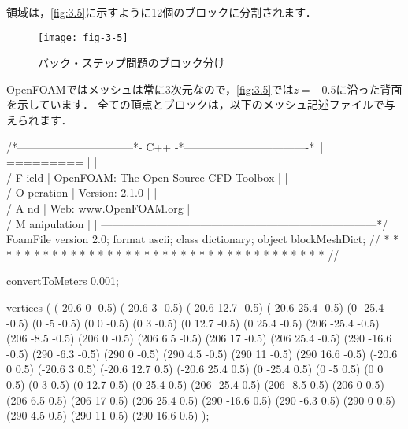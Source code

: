 領域は，\autoref{fig:3.5}に示すように12個のブロックに分割されます．


\begin{figure}[ht]
 \texttt{[image: fig-3-5]}
 \caption{バック・ステップ問題のブロック分け}
 \label{fig:3.5}
\end{figure}


OpenFOAMではメッシュは常に3次元なので，\autoref{fig:3.5}では$z = -0.5$に沿った背面を示しています．
全ての頂点とブロックは，以下のメッシュ記述ファイルで与えられます．
\begin{OFverbatim}
/*--------------------------------*- C++ -*----------------------------------*\
| =========                 |                                                 |
| \\      /  F ield         | OpenFOAM: The Open Source CFD Toolbox           |
|  \\    /   O peration     | Version:  2.1.0                                 |
|   \\  /    A nd           | Web:      www.OpenFOAM.org                      |
|    \\/     M anipulation  |                                                 |
\*---------------------------------------------------------------------------*/
FoamFile
{
    version     2.0;
    format      ascii;
    class       dictionary;
    object      blockMeshDict;
}
// * * * * * * * * * * * * * * * * * * * * * * * * * * * * * * * * * * * * * //

convertToMeters 0.001;

vertices
(
    (-20.6 0 -0.5)
    (-20.6 3 -0.5)
    (-20.6 12.7 -0.5)
    (-20.6 25.4 -0.5)
    (0 -25.4 -0.5)
    (0 -5 -0.5)
    (0 0 -0.5)
    (0 3 -0.5)
    (0 12.7 -0.5)
    (0 25.4 -0.5)
    (206 -25.4 -0.5)
    (206 -8.5 -0.5)
    (206 0 -0.5)
    (206 6.5 -0.5)
    (206 17 -0.5)
    (206 25.4 -0.5)
    (290 -16.6 -0.5)
    (290 -6.3 -0.5)
    (290 0 -0.5)
    (290 4.5 -0.5)
    (290 11 -0.5)
    (290 16.6 -0.5)
    (-20.6 0 0.5)
    (-20.6 3 0.5)
    (-20.6 12.7 0.5)
    (-20.6 25.4 0.5)
    (0 -25.4 0.5)
    (0 -5 0.5)
    (0 0 0.5)
    (0 3 0.5)
    (0 12.7 0.5)
    (0 25.4 0.5)
    (206 -25.4 0.5)
    (206 -8.5 0.5)
    (206 0 0.5)
    (206 6.5 0.5)
    (206 17 0.5)
    (206 25.4 0.5)
    (290 -16.6 0.5)
    (290 -6.3 0.5)
    (290 0 0.5)
    (290 4.5 0.5)
    (290 11 0.5)
    (290 16.6 0.5)
);


\end{OFverbatim}
